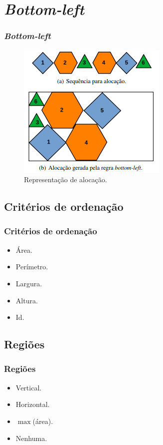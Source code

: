 \documentclass[12pt]{beamer}
\begin{document}
    \section{\textit{Bottom-left}}\label{sec:bottom-left}
    \begin{frame}
        \frametitle{\textit{Bottom-left}}
        \begin{figure}[!htb]
            \centering
            \includegraphics[scale=0.8]{utils/images/bottom-left}
            \caption{Representação de alocação.}
            \label{fig:bottom-left}
        \end{figure}
    \end{frame}

    \subsection{Critérios de ordenação}\label{subsec:criterios-de-ordenacao}
    \begin{frame}
        \frametitle{Critérios de ordenação}
        \begin{itemize}
            \item Área.
            \item Perímetro.
            \item Largura.
            \item Altura.
            \item Id.
        \end{itemize}
    \end{frame}

    \subsection{Regiões}\label{subsec:regioes}
    \begin{frame}
        \frametitle{Regiões}
        \begin{itemize}
            \item Vertical.
            \item Horizontal.
            \item $\max$(área).
            \item Nenhuma.
        \end{itemize}
    \end{frame}
\end{document}
